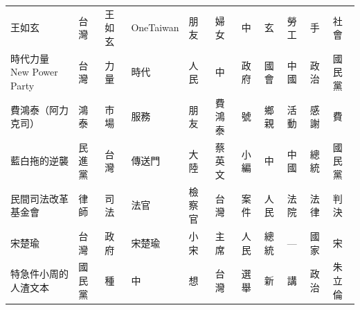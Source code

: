 \documentclass[letterpaper, 10pt, conference]{ieeeconf}   %
\begin{document}
\begin{CJK}{UTF8}{bsmi}
\begin{longtable}[c]{@{}L{2.45cm}L{1.1cm}L{1.1cm}L{1.1cm}L{1.1cm}L{1.1cm}L{1.1cm}L{1.1cm}L{1.1cm}L{1.1cm}L{1.1cm}@{}}
王如玄 & 台灣 & 王如玄 & OneTaiwan & 朋友 & 婦女 & 中 & 玄 & 勞工 & 手 & 社會 \\
時代力量 New Power Party & 台灣 & 力量 & 時代 & 人民 & 中 & 政府 & 國會 & 中國 & 政治 & 國民黨 \\
費鴻泰（阿力克司） & 鴻泰 & 市場 & 服務 & 朋友 & 費鴻泰 & 號 & 鄉親 & 活動 & 感謝 & 費 \\
藍白拖的逆襲 & 民進黨 & 台灣 & 傳送門 & 大陸 & 蔡英文 & 小編 & 中 & 中國 & 總統 & 國民黨 \\
民間司法改革基金會 & 律師 & 司法 & 法官 & 檢察官 & 台灣 & 案件 & 人民 & 法院 & 法律 & 判決 \\
宋楚瑜 & 台灣 & 政府 & 宋楚瑜 & 小宋 & 主席 & 人民 & 總統 & — & 國家 & 宋 \\
特急件小周的人渣文本 & 國民黨 & 種 & 中 & 想 & 台灣 & 選舉 & 新 & 講 & 政治 & 朱立倫 \\* \bottomrule
\end{longtable}


\end{CJK}
\end{document}
